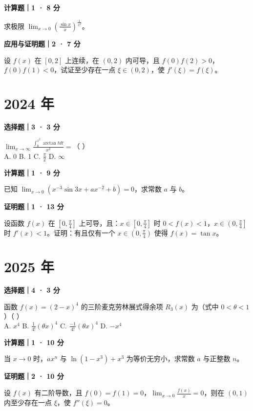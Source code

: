 \textbf{计算题｜1 · 8 分}

求极限 $\lim_{x \to 0} \left( \frac{\sin x}{x} \right)^{\frac{1}{x^2}}$。


\textbf{应用与证明题｜2 · 7 分}

设 $f(x)$ 在 $[0, 2]$ 上连续，在 $(0, 2)$ 内可导，且 $f(0)f(2) > 0$，$f(0)f(1) < 0$，试证至少存在一点 $\xi \in (0, 2)$，使 $f'(\xi) = f(\xi)$。


\section*{2024 年}


\textbf{选择题｜3 · 3 分}

$\lim_{x \to \infty} \frac{\int_0^{x^2} \arctan t dt}{x^2} =$（ \quad ）\\
A. 0 \quad B. 1 \quad C. $\frac{\pi}{2}$ \quad D. $\infty$


\textbf{计算题｜1 · 9 分}

已知 $\lim_{x \to 0}(x^{-3}\sin 3x + ax^{-2} + b) = 0$，求常数 $a$ 与 $b$。


\textbf{证明题｜1 · 13 分}

设函数 $f(x)$ 在 $\left[0, \frac{\pi}{4}\right]$ 上可导，且：$x \in \left[0, \frac{\pi}{4}\right]$ 时 $0 < f(x) < 1$，$x \in \left(0, \frac{\pi}{4}\right]$ 时 $f'(x) < 1$。证明：有且仅有一个 $x \in \left(0, \frac{\pi}{4}\right)$ 使得 $f(x) = \tan x$。


\section*{2025 年}


\textbf{选择题｜4 · 3 分}

函数 $f(x) = (2-x)^4$ 的三阶麦克劳林展式得余项 $R_3(x)$ 为（式中 $0 < \theta < 1$）（ \quad ）\\
A. $x^4$ \quad B. $\frac{1}{4!}(\theta x)^4$ \quad C. $\frac{-1}{4!}(\theta x)^4$ \quad D. $-x^4$


\textbf{计算题｜1 · 10 分}

当 $x \to 0$ 时，$ax^n$ 与 $\ln(1-x^3) + x^3$ 为等价无穷小，求常数 $a$ 与正整数 $n$。


\textbf{证明题｜2 · 10 分}

设 $f(x)$ 有二阶导数，且 $f(0) = f(1) = 0$，$\lim_{x \to 0} \frac{f(x)}{x} = 0$，则在 $(0, 1)$ 内至少存在一点 $\xi$，使 $f''(\xi) = 0$。
